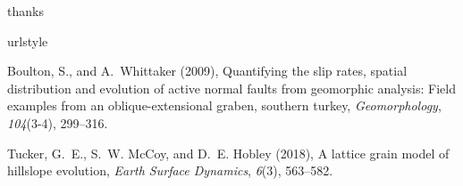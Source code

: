 %
%


%
 

%




%

\acknowledgments
thanks




%
%
%
%
%
%
%
%
%



%

\begin{thebibliography}{1}
\providecommand{\natexlab}[1]{#1}
\expandafter\ifx\csname urlstyle\endcsname\relax
  \providecommand{\doi}[1]{doi:\discretionary{}{}{}#1}\else
  \providecommand{\doi}{doi:\discretionary{}{}{}\begingroup
  \urlstyle{rm}\Url}\fi

Boulton, S., and A.~Whittaker (2009), Quantifying the slip rates, spatial
  distribution and evolution of active normal faults from geomorphic analysis:
  Field examples from an oblique-extensional graben, southern turkey,
  \textit{Geomorphology}, \textit{104}(3-4), 299--316.

Tucker, G.~E., S.~W. McCoy, and D.~E. Hobley (2018), A lattice grain model of
  hillslope evolution, \textit{Earth Surface Dynamics}, \textit{6}(3),
  563--582.


\end{thebibliography}





